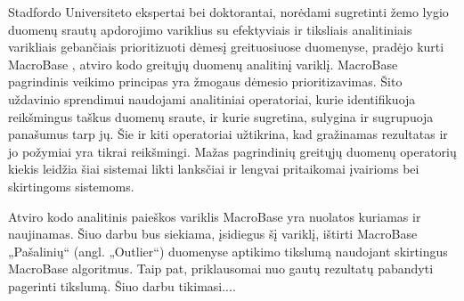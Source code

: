 \documentclass{VUMIFPSkursinis}
\begin{document}
Stadfordo Universiteto ekspertai bei doktorantai, norėdami sugretinti žemo lygio duomenų srautų apdorojimo variklius su efektyviais ir tiksliais analitiniais varikliais gebančiais prioritizuoti dėmesį greituosiuose duomenyse, pradėjo kurti MacroBase \cite{macrobase_overview}, atviro kodo greitųjų duomenų analitinį variklį. MacroBase pagrindinis veikimo principas yra žmogaus dėmesio prioritizavimas. Šito uždavinio sprendimui naudojami analitiniai operatoriai, kurie identifikuoja reikšmingus taškus duomenų sraute, ir kurie sugretina, sulygina ir sugrupuoja panašumus tarp jų. Šie ir kiti operatoriai užtikrina, kad gražinamas rezultatas ir jo požymiai yra tikrai reikšmingi. Mažas pagrindinių greitųjų duomenų operatorių kiekis leidžia šiai sistemai likti lanksčiai ir lengvai pritaikomai įvairioms bei skirtingoms sistemoms. \par
Atviro kodo analitinis paieškos variklis MacroBase yra nuolatos kuriamas ir naujinamas. Šiuo darbu bus siekiama, įsidiegus šį variklį, ištirti MacroBase „Pašalinių“ (angl. „Outlier“) duomenyse aptikimo tikslumą naudojant skirtingus MacroBase algoritmus. Taip pat, priklausomai nuo gautų rezultatų pabandyti pagerinti tikslumą. Šiuo darbu tikimasi....






\end{document}

